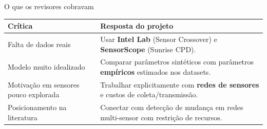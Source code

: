\documentclass[aspectratio=169, 11pt]{beamer}
\begin{document}
\begin{frame}{O que os revisores cobravam}

\begin{center}
\small
\begin{tabular}{@{}p{5.0cm}p{7.0cm}@{}}
  \toprule
  \textbf{Crítica} & \textbf{Resposta do projeto} \\
  \midrule
  Falta de dados reais &
    Usar \textbf{Intel Lab} (Sensor Crossover) e
    \textbf{SensorScope} (Sunrise CPD). \\
  \addlinespace[3pt]
  Modelo muito idealizado &
    Comparar parâmetros sintéticos com parâmetros
    \textbf{empíricos} estimados nos datasets. \\
  \addlinespace[3pt]
  Motivação em sensores pouco explorada &
    Trabalhar explicitamente com \textbf{redes de sensores}
    e custos de coleta/transmissão. \\
  \addlinespace[3pt]
  Posicionamento na literatura &
    Conectar com detecção de mudança em redes
    multi-sensor com restrição de recursos. \\
  \bottomrule
\end{tabular}
\end{center}

\end{frame}
\end{document}

